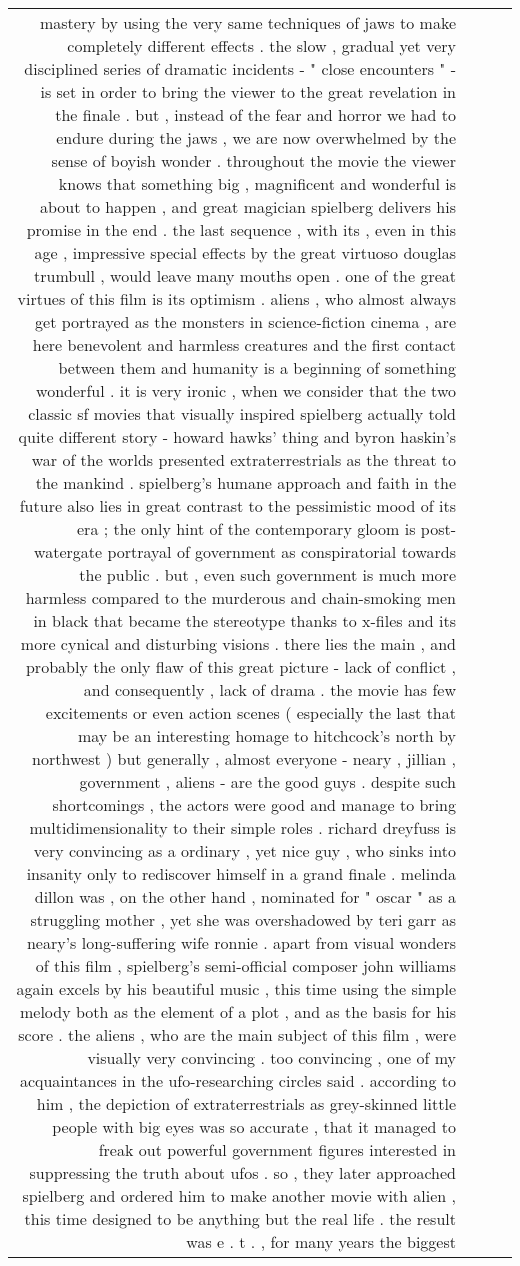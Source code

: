 \begin{tabular}{r{1cm} p{0.4in} r{1cm} p{0.4in}}
mastery by using the very same techniques of jaws to make completely different effects .  the slow , gradual yet very disciplined series of dramatic incidents - " close encounters " - is set in order to bring the viewer to the great revelation in the finale .  but , instead of the fear and horror we had to endure during the jaws , we are now overwhelmed by the sense of boyish wonder .  throughout the movie the viewer knows that something big , magnificent and wonderful is about to happen , and great magician spielberg delivers his promise in the end .  the last sequence , with its , even in this age , impressive special effects by the great virtuoso douglas trumbull , would leave many mouths open .  one of the great virtues of this film is its optimism .  aliens , who almost always get portrayed as the monsters in science-fiction cinema , are here benevolent and harmless creatures and the first contact between them and humanity is a beginning of something wonderful .  it is very ironic , when we consider that the two classic sf movies that visually inspired spielberg actually told quite different story - howard hawks' thing and byron haskin's war of the worlds presented extraterrestrials as the threat to the mankind .  spielberg's humane approach and faith in the future also lies in great contrast to the pessimistic mood of its era ; the only hint of the contemporary gloom is post-watergate portrayal of government as conspiratorial towards the public .  but , even such government is much more harmless compared to the murderous and chain-smoking men in black that became the stereotype thanks to x-files and its more cynical and disturbing visions .  there lies the main , and probably the only flaw of this great picture - lack of conflict , and consequently , lack of drama .  the movie has few excitements or even action scenes ( especially the last that may be an interesting homage to hitchcock's north by northwest ) but generally , almost everyone - neary , jillian , government , aliens - are the good guys .  despite such shortcomings , the actors were good and manage to bring multidimensionality to their simple roles .  richard dreyfuss is very convincing as a ordinary , yet nice guy , who sinks into insanity only to rediscover himself in a grand finale .  melinda dillon was , on the other hand , nominated for " oscar " as a struggling mother , yet she was overshadowed by teri garr as neary's long-suffering wife ronnie .  apart from visual wonders of this film , spielberg's semi-official composer john williams again excels by his beautiful music , this time using the simple melody both as the element of a plot , and as the basis for his score .  the aliens , who are the main subject of this film , were visually very convincing .  too convincing , one of my acquaintances in the ufo-researching circles said .  according to him , the depiction of extraterrestrials as grey-skinned little people with big eyes was so accurate , that it managed to freak out powerful government figures interested in suppressing the truth about ufos .  so , they later approached spielberg and ordered him to make another movie with alien , this time designed to be anything but the real life .  the result was e . t . , for many years the biggest 
\end{tabular}
